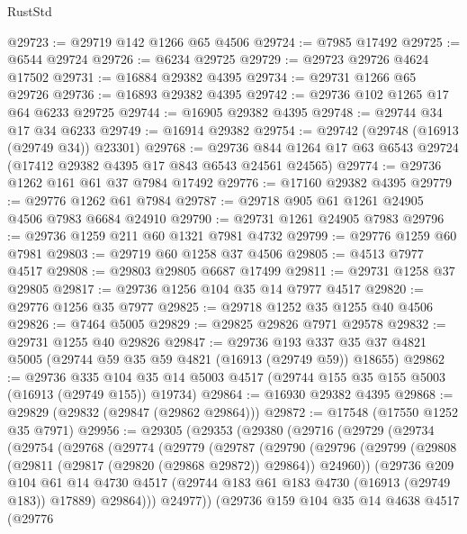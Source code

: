 \begin{lexlean}{RustStd}
\begin{coremodule}
@29723 := @29719 @142 @1266 @65 @4506
@29724 := @7985 @17492
@29725 := @6544 @29724
@29726 := @6234 @29725
@29729 := @29723 @29726 @4624 @17502
@29731 := @16884 @29382 @4395
@29734 := @29731 @1266 @65 @29726
@29736 := @16893 @29382 @4395
@29742 := @29736 @102 @1265 @17 @64 @6233 @29725
@29744 := @16905 @29382 @4395
@29748 := @29744 @34 @17 @34 @6233
@29749 := @16914 @29382
@29754 := @29742 (@29748 (@16913 (@29749 @34)) @23301)
@29768 := @29736 @844 @1264 @17 @63 @6543 @29724 (@17412 @29382 @4395 @17 @843 @6543 @24561 @24565)
@29774 := @29736 @1262 @161 @61 @37 @7984 @17492
@29776 := @17160 @29382 @4395
@29779 := @29776 @1262 @61 @7984
@29787 := @29718 @905 @61 @1261 @24905 @4506 @7983 @6684 @24910
@29790 := @29731 @1261 @24905 @7983
@29796 := @29736 @1259 @211 @60 @1321 @7981 @4732
@29799 := @29776 @1259 @60 @7981
@29803 := @29719 @60 @1258 @37 @4506
@29805 := @4513 @7977 @4517
@29808 := @29803 @29805 @6687 @17499
@29811 := @29731 @1258 @37 @29805
@29817 := @29736 @1256 @104 @35 @14 @7977 @4517
@29820 := @29776 @1256 @35 @7977
@29825 := @29718 @1252 @35 @1255 @40 @4506
@29826 := @7464 @5005
@29829 := @29825 @29826 @7971 @29578
@29832 := @29731 @1255 @40 @29826
@29847 := @29736
    @193
    @337
    @35
    @37
    @4821
    @5005
    (@29744 @59 @35 @59 @4821 (@16913 (@29749 @59)) @18655)
@29862 := @29736
    @335
    @104
    @35
    @14
    @5003
    @4517
    (@29744 @155 @35 @155 @5003 (@16913 (@29749 @155)) @19734)
@29864 := @16930 @29382 @4395
@29868 := @29829 (@29832 (@29847 (@29862 @29864)))
@29872 := @17548 (@17550 @1252 @35 @7971)
@29956 := @29305
    (@29353
      (@29380
        (@29716
          (@29729
            (@29734
              (@29754
                (@29768
                  (@29774
                    (@29779
                      (@29787
                        (@29790
                          (@29796
                            (@29799
                              (@29808 (@29811 (@29817 (@29820 (@29868 @29872)) @29864)) @24960))
                            (@29736
                              @209
                              @104
                              @61
                              @14
                              @4730
                              @4517
                              (@29744 @183 @61 @183 @4730 (@16913 (@29749 @183)) @17889)
                              @29864)))
                        @24977))
                    (@29736
                      @159
                      @104
                      @35
                      @14
                      @4638
                      @4517
                      (@29776

\end{coremodule}
\end{lexlean}
